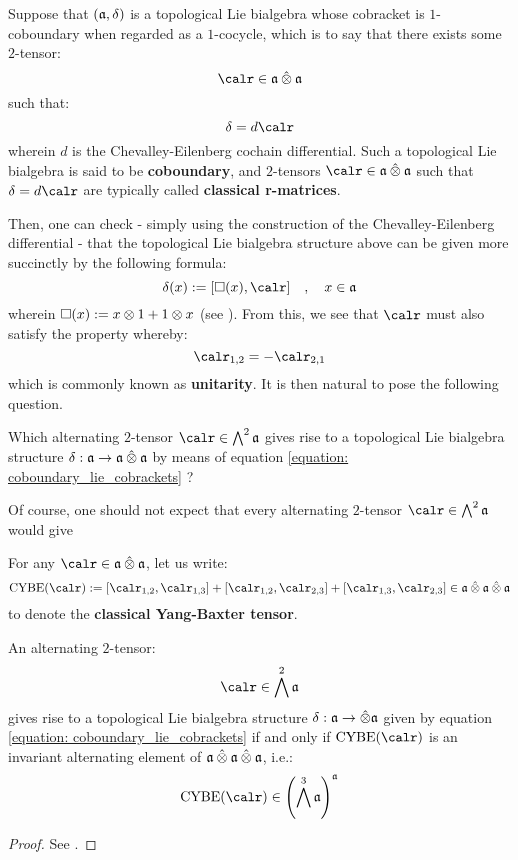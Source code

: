 
Suppose that $(\mathfrak{a}, \delta)$ is a topological Lie bialgebra whose cobracket is $1$-coboundary when regarded as a $1$-cocycle, which is to say that there exists some $2$-tensor:
    $$\calr \in \a \hattensor \a$$
such that:
    $$\delta = d\calr$$
wherein $d$ is the Chevalley-Eilenberg cochain differential. Such a topological Lie bialgebra is said to be \textbf{coboundary}, and $2$-tensors $\calr \in \a \hattensor \a$ such that $\delta = d\calr$ are typically called \textbf{classical r-matrices}.
\begin{remark} \label{remark: classical_r_matrices_non_uniqueness}
    
\end{remark}
Then, one can check - simply using the construction of the Chevalley-Eilenberg differential - that the topological Lie bialgebra structure above can be given more succinctly by the following formula:
    \begin{equation} \label{equation: coboundary_lie_cobrackets}
        \delta(x) := [\Box(x), \calr] \quad, \quad x \in \a
    \end{equation}
wherein $\Box(x) := x \tensor 1 + 1 \tensor x$ (see \cite[Section 3.2]{etingof_schiffmann_lectures_on_quantum_groups}). From this, we see that $\calr$ must also satisfy the property whereby:
    \begin{equation} \label{equation: unitary_classical_r_matrices}
        \calr_{1, 2} = -\calr_{2, 1}
    \end{equation}
which is commonly known as \textbf{unitarity}. It is then natural to pose the following question.
\begin{question}
    Which alternating $2$-tensor $\calr \in \bigwedge^2 \a$ gives rise to a topological Lie bialgebra structure $\delta: \a \to \a \hattensor \a$ by means of equation \eqref{equation: coboundary_lie_cobrackets} ?
\end{question}
Of course, one should not expect that every alternating $2$-tensor $\calr \in \bigwedge^2 \a$ would give 
\begin{proposition}[Drinfeld] \label{prop: coboundary_lie_bialgebras_and_CYBEs}
    For any $\calr \in \a \hattensor \a$, let us write:
        \begin{equation} \label{equation: classical_yang_baxter_tensor}
            \CYBE(\calr) := [\calr_{1, 2}, \calr_{1, 3}] + [\calr_{1, 2}, \calr_{2, 3}] + [\calr_{1, 3}, \calr_{2, 3}] \in \a \hattensor \a \hattensor \a
        \end{equation}
    to denote the \textbf{classical Yang-Baxter tensor}. 

    An alternating $2$-tensor:
        $$\calr \in \bigwedge^2 \a$$
    gives rise to a topological Lie bialgebra structure $\delta: \a \to \hattensor \a$ given by equation \eqref{equation: coboundary_lie_cobrackets} if and only if $\CYBE(\calr)$ is an invariant alternating element of $\a \hattensor \a \hattensor \a$, i.e.:
        $$\CYBE(\calr) \in \left( \bigwedge^3 \a \right)^{\a}$$
\end{proposition}
    \begin{proof}
        See \cite[Theorem 3.1]{etingof_schiffmann_lectures_on_quantum_groups}.
    \end{proof}